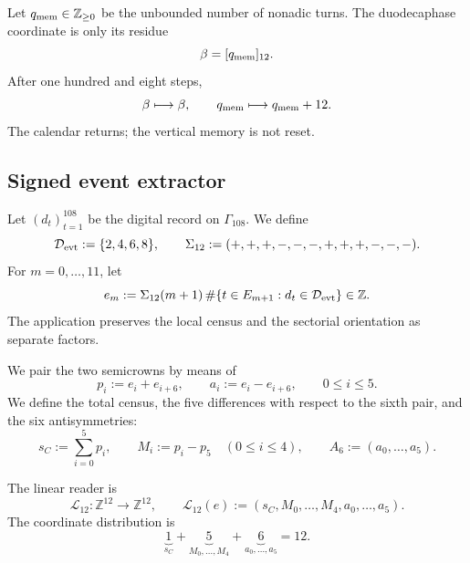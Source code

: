 {Let \(q_{\rm mem}\in\mathbb Z_{\geq0}\) be the unbounded number of nonadic
turns. The duodecaphase coordinate is only its residue
\[
 \beta=[q_{\rm mem}]_{12}.
\]
After one hundred and eight steps,
\[
 \beta\longmapsto\beta,
 \qquad
 q_{\rm mem}\longmapsto q_{\rm mem}+12.
\]
The calendar returns; the vertical memory is not reset.

\subsection{Signed event extractor}

Let \((d_t)_{t=1}^{108}\) be the digital record on
\(\Gamma_{108}\). We define
\begin{equation}
 \mathcal D_{\rm evt}:=\{2,4,6,8\},
 \qquad
 \Sigma_{12}:=(+,+,+,-,-,-,+,+,+,-,-,-).
 \label{p12-83-c1-s9:eq:u006d-datos-eventos}
\end{equation}
For \(m=0,\ldots,11\), let
\begin{equation}
 e_m:=
 \Sigma_{12}(m+1)\,
 \#\{t\in E_{m+1}:d_t\in\mathcal D_{\rm evt}\}
 \in\mathbb Z.
 \label{p12-83-c1-s9:eq:u006d-eventos-firmados}
\end{equation}
The application preserves the local census and the sectorial orientation as separate factors.

We pair the two semicrowns by means of
\begin{equation}
 p_i:=e_i+e_{i+6},
 \qquad
 a_i:=e_i-e_{i+6},
 \qquad 0\leq i\leq5.
 \label{p12-83-c1-s9:eq:u006d-pares-antipodales}
\end{equation}
We define the total census, the five differences with respect to the sixth pair,
and the six antisymmetries:
\begin{equation}
 s_C:=\sum_{i=0}^{5}p_i,
 \qquad
 M_i:=p_i-p_5\quad(0\leq i\leq4),
 \qquad
 A_6:=(a_0,\ldots,a_5).
 \label{p12-83-c1-s9:eq:u006d-coordenadas-uno-cinco-seis}
\end{equation}

\begin{definition}
\label{p12-83-c1-s9:def:u006d-lector-integral}
The linear reader is
\begin{equation}
 \mathcal L_{12}:\mathbb Z^{12}\longrightarrow\mathbb Z^{12},
 \qquad
 \mathcal L_{12}(e)
 :=
 (s_C,M_0,\ldots,M_4,a_0,\ldots,a_5).
 \label{p12-83-c1-s9:eq:u006d-lector-l12}
\end{equation}
The coordinate distribution is
\begin{equation}
 \underbrace{1}_{s_C}
 +\underbrace{5}_{M_0,\ldots,M_4}
 +\underbrace{6}_{a_0,\ldots,a_5}
 =12.
 \label{p12-83-c1-s9:eq:u006d-uno-cinco-seis}
\end{equation}
\end{definition}

}
